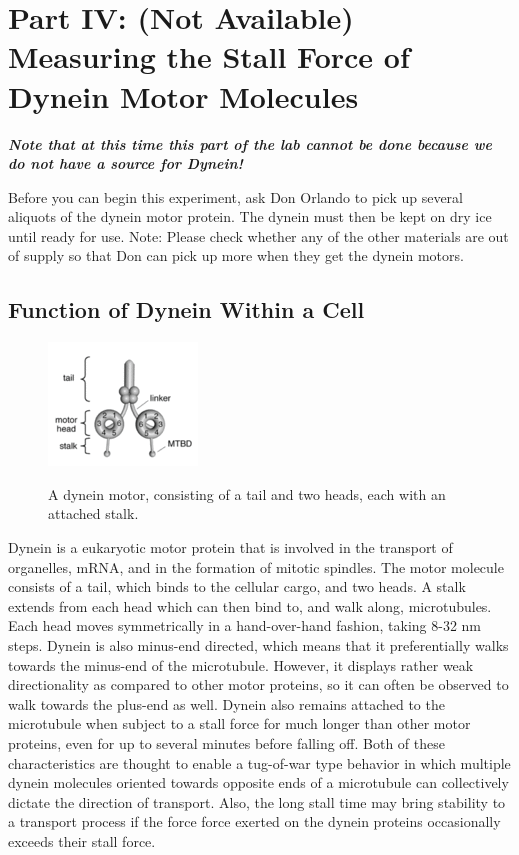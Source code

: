 \documentclass{../lab}
\begin{document}
\section{Part IV: (Not Available) Measuring the Stall Force of Dynein Motor Molecules}

\emph{\textbf{Note that at this time this part of the lab cannot be done because we do not have a source for Dynein!}}

Before you can begin this experiment, ask Don Orlando to pick up several aliquots of the dynein motor protein. The dynein must then be kept on dry ice until ready for use.  Note: Please check whether any of the other materials are out of supply so that Don can pick up more when they get the dynein motors.

\subsection{Function of Dynein Within a Cell}

\begin{figure}[h]
    \centering
    \href{http://experimentationlab.berkeley.edu/sites/default/files/images/150px-Dynein_Motor.gif}{\includegraphics[width=0.5\linewidth]{images/150px-Dynein_Motor.png}}
    \caption{A dynein motor, consisting of a tail and two heads, each with an attached stalk.}
    \label{fig:150px-Dynein_Motor}
\end{figure}

Dynein is a eukaryotic motor protein that is involved in the transport of organelles, mRNA, and in the formation of mitotic spindles. The motor molecule consists of a tail, which binds to the cellular cargo, and two heads. A stalk extends from each head which can then bind to, and walk along, microtubules. Each head moves symmetrically in a hand-over-hand fashion, taking 8-32 nm steps. Dynein is also minus-end directed, which means that it preferentially walks towards the minus-end of the microtubule. However, it displays rather weak directionality as compared to other motor proteins, so it can often be observed to walk towards the plus-end as well. Dynein also remains attached to the microtubule when subject to a stall force for much longer than other motor proteins, even for up to several minutes before falling off. Both of these characteristics are thought to enable a tug-of-war type behavior in which multiple dynein molecules oriented towards opposite ends of a microtubule can collectively dictate the direction of transport. Also, the long stall time may bring stability to a transport process if the force force exerted on the dynein proteins occasionally exceeds their stall force.
\end{document}
